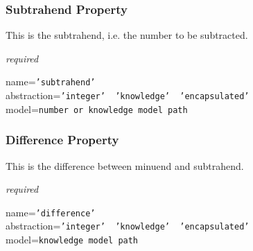 \subsubsection{Subtrahend Property}

This is the subtrahend, i.e. the number to be subtracted.

\emph{required}

name=\texttt{'subtrahend'}\\
abstraction=\texttt{'integer' \vline\ 'knowledge' \vline\ 'encapsulated'}\\
model=\texttt{number or knowledge model path}

\subsubsection{Difference Property}

This is the difference between minuend and subtrahend.

\emph{required}

name=\texttt{'difference'}\\
abstraction=\texttt{'integer' \vline\ 'knowledge' \vline\ 'encapsulated'}\\
model=\texttt{knowledge model path}
